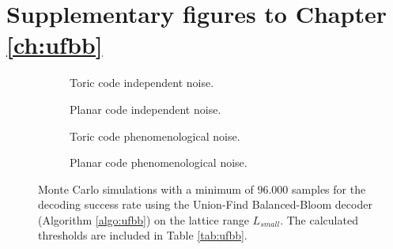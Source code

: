 \chapter{Supplementary figures to Chapter \ref{ch:ufbb}}\label{ap:figufbb}


\begin{figure}[htbp]
  \centering
  \begin{subfigure}[b]{0.49\textwidth}
    \begin{adjustbox}{Clip=0 1em 0 0}
      
    \end{adjustbox}
    \caption{Toric code independent noise.}
  \end{subfigure}
  \begin{subfigure}[b]{0.49\textwidth}
    \begin{adjustbox}{Clip=0 1em 0 0}
      
    \end{adjustbox}
    \caption{Planar code independent noise.}
  \end{subfigure}
  \begin{subfigure}[b]{0.49\textwidth}
    \begin{adjustbox}{Clip=0 1em 0 0}
      
    \end{adjustbox}
    \caption{Toric code phenomenological noise.}
  \end{subfigure}
  \begin{subfigure}[b]{0.49\textwidth}
    \begin{adjustbox}{Clip=0 1em 0 0}
      
    \end{adjustbox}
    \caption{Planar code phenomenological noise.}
  \end{subfigure}
  \caption{Monte Carlo simulations with a minimum of $96.000$ samples for the decoding success rate using the Union-Find Balanced-Bloom decoder (Algorithm \ref{algo:ufbb}) on the lattice range $L_{small}$. The calculated thresholds are included in Table \ref{tab:ufbb}.}
  \label{fig:threshold_ufbbsmall}
\end{figure}


